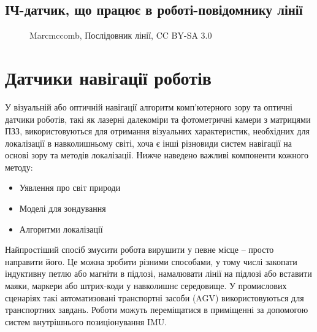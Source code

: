 \documentclass[a4paper,14pt]{extreport}
\begin{document}
\subsection{ІЧ-датчик, що працює в роботі-повідомнику лінії}
\begin{figure}[h!]
   \caption{Marcmccomb, Послідовник лінії, CC BY-SA 3.0}
 \end{figure}


\section{Датчики навігації роботів}\par

У візуальній або оптичній навігації алгоритм комп'ютерного зору та оптичні датчики роботів, такі як лазерні далекоміри та фотометричні камери з матрицями ПЗЗ, використовуються для отримання візуальних характеристик, необхідних для локалізації в навколишньому світі, хоча є інші різновиди систем навігації на основі зору та методів локалізації. Нижче наведено важливі компоненти кожного методу:

\begin{itemize}
\item Уявлення про світ природи
\item Моделі для зондування
\item Алгоритми локалізації
\end{itemize}


Найпростіший спосіб змусити робота вирушити у певне місце – просто направити його. Це можна зробити різними способами, у тому числі закопати індуктивну петлю або магніти в підлозі, намалювати лінії на підлозі або вставити маяки, маркери або штрих-коди у навколишнє середовище. У промислових сценаріях такі автоматизовані транспортні засоби (AGV) використовуються для транспортних завдань. Роботи можуть переміщатися в приміщенні за допомогою систем внутрішнього позиціонування IMU.\\ 
\end{document}
